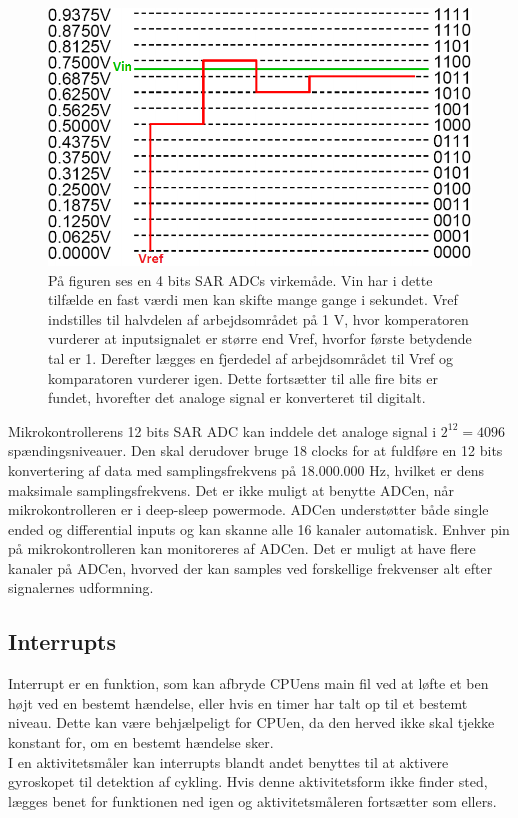 \begin{figure}[H]
	\centering
	\includegraphics[scale=0.52]{figures/bProblemloesning/SAR_ADC.png}
	\caption{På figuren ses en 4 bits SAR ADCs virkemåde. Vin har i dette tilfælde en fast værdi men kan skifte mange gange i sekundet. Vref indstilles til halvdelen af arbejdsområdet på 1 V, hvor komperatoren vurderer at inputsignalet er større end Vref, hvorfor første betydende tal er 1. Derefter lægges en fjerdedel af arbejdsområdet til Vref og komparatoren vurderer igen. Dette fortsætter til alle fire bits er fundet, hvorefter det analoge signal er konverteret til digitalt.}
	\label{fig:SAR_ADC}
\end{figure}\vspace{-0.5cm}

Mikrokontrollerens 12 bits SAR ADC kan inddele det analoge signal i $2^{12} = 4096$ spændingsniveauer. Den skal derudover bruge 18 clocks for at fuldføre en 12 bits konvertering af data med samplingsfrekvens på 18.000.000 Hz, hvilket er dens maksimale samplingsfrekvens. Det er ikke muligt at benytte ADCen, når mikrokontrolleren er i deep-sleep powermode. \newline 
ADCen understøtter både single ended og differential inputs og kan skanne alle 16 kanaler automatisk. Enhver pin på mikrokontrolleren kan monitoreres af ADCen. Det er muligt at have flere kanaler på ADCen, hvorved der kan samples ved forskellige frekvenser alt efter signalernes udformning. \citep{Semiconductor20164200M}

\subsection{Interrupts}
Interrupt er en funktion, som kan afbryde CPUens main fil ved at løfte et ben højt ved en bestemt hændelse, eller hvis en timer har talt op til et bestemt niveau. Dette kan være behjælpeligt for CPUen, da den herved ikke skal tjekke konstant for, om en bestemt hændelse sker. \citep{Badiger2016} \\
I en aktivitetsmåler kan interrupts blandt andet benyttes til at aktivere gyroskopet til detektion af cykling. Hvis denne aktivitetsform ikke finder sted, lægges benet for funktionen ned igen og aktivitetsmåleren fortsætter som ellers.

